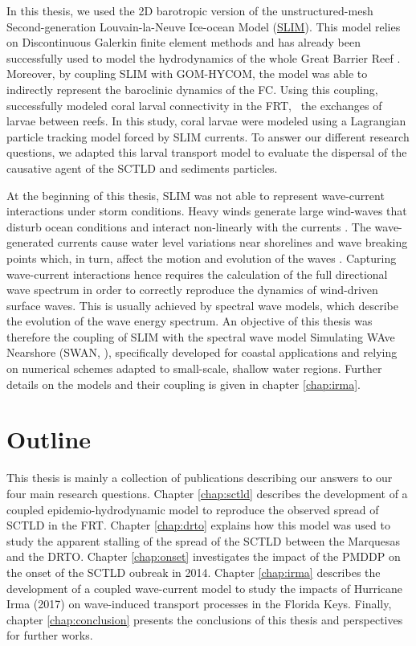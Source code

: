 In this thesis, we used the 2D barotropic version of the unstructured-mesh Second-generation Louvain-la-Neuve Ice-ocean Model (\href{https://www.slim-ocean.be/}{SLIM}). This model relies on Discontinuous Galerkin finite element methods \citep{aizinger2002discontinuous} and has already been successfully used to model the hydrodynamics of the whole Great Barrier Reef \citep{lambrechts2008multi}. Moreover, by coupling SLIM with GOM-HYCOM, the model was able to indirectly represent the baroclinic dynamics of the FC. Using this coupling, \cite{frys2020fine} successfully modeled coral larval connectivity in the FRT, \ie~the exchanges of larvae between reefs. In this study, coral larvae were modeled using a Lagrangian particle tracking model \citep{van2018lagrangian} forced by SLIM currents. To answer our different research questions, we adapted this larval transport model to evaluate the dispersal of the causative agent of the SCTLD and sediments particles.

At the beginning of this thesis, SLIM was not able to represent wave-current interactions under storm conditions. Heavy winds generate large wind-waves that disturb ocean conditions and interact non-linearly with the currents \citep{liu2020impacts,wu2011fvcom}. The wave-generated currents cause water level variations near shorelines and wave breaking points which, in turn, affect the motion and evolution of the waves \citep{longuet1970longshore, sikiric2013coupling}. Capturing wave-current interactions hence requires the calculation of the full directional wave spectrum in order to correctly reproduce the dynamics of wind-driven surface waves. This is usually achieved by spectral wave models, which describe the evolution of the wave energy spectrum. An objective of this thesis was therefore the coupling of SLIM with the spectral wave model Simulating WAve Nearshore (SWAN, \citealp{booij1999third}), specifically developed for coastal applications and relying on numerical schemes adapted to small-scale, shallow water regions. Further details on the models and their coupling is given in chapter \ref{chap:irma}.

\section*{Outline}
This thesis is mainly a collection of publications describing our answers to our four main research questions. Chapter \ref{chap:sctld} describes the development of a coupled epidemio-hydrodynamic model to reproduce the observed spread of SCTLD in the FRT. Chapter \ref{chap:drto} explains how this model was used to study the apparent stalling of the spread of the SCTLD between the Marquesas and the DRTO. Chapter \ref{chap:onset} investigates the impact of the PMDDP on the onset of the SCTLD oubreak in 2014. Chapter \ref{chap:irma} describes the development of a coupled wave-current model to study the impacts of Hurricane Irma (2017) on wave-induced transport processes in the Florida Keys. Finally, chapter \ref{chap:conclusion} presents the conclusions of this thesis and perspectives for further works. 

